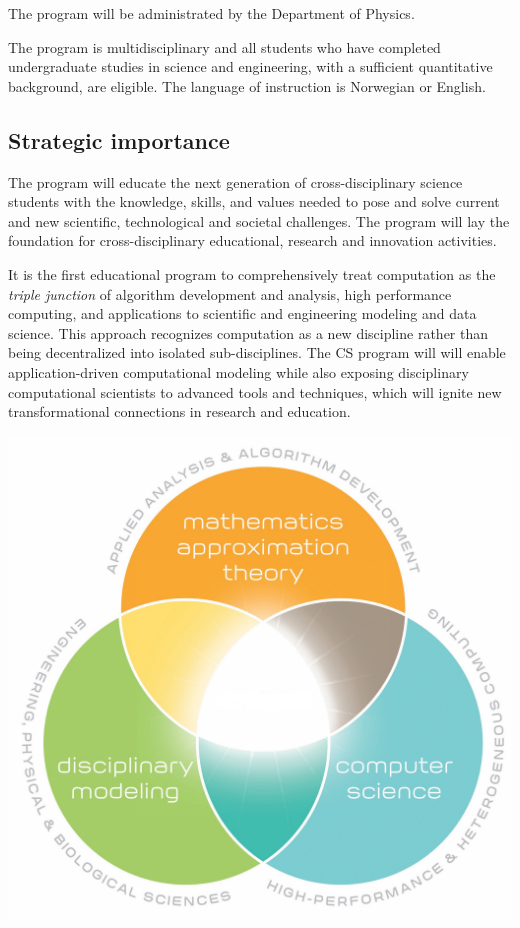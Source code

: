 \documentclass[%
oneside,                 %
final,                   %
10pt]{article}
\begin{document}
\noindent
The program will be administrated by the Department of Physics.

The program is multidisciplinary and all students who have completed
undergraduate studies in science and engineering, with a sufficient
quantitative background, are eligible.  The language of instruction is
Norwegian or English.



\subsection*{Strategic importance}

The program will educate the next generation of cross-disciplinary
science students with the knowledge, skills, and values needed to pose
and solve current and new scientific, technological and societal
challenges. The program will lay the foundation for cross-disciplinary
educational, research and innovation activities.

It is the first educational program to
comprehensively treat computation as the \emph{triple junction} of
algorithm development and analysis, high performance computing, and
applications to scientific and engineering modeling and data
science. This approach recognizes computation as a new discipline
rather than being decentralized into isolated sub-disciplines. The CS program
will  will enable application-driven computational modeling
while also exposing disciplinary computational scientists to
advanced tools and techniques, which will ignite new
transformational connections in research and education.

\vspace{6mm}

\centerline{\includegraphics[width=0.6\linewidth]{figslides/cs.jpg}}
\end{document}

